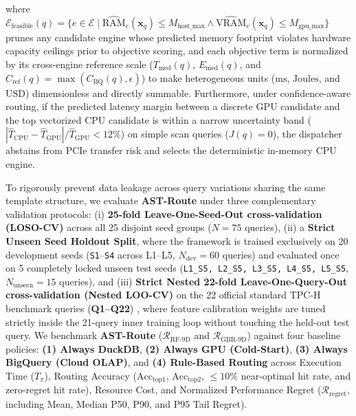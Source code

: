 \documentclass[10pt,a4paper]{article}
\begin{document}
where $\mathcal{E}_{\text{feasible}}(q) = \{e \in \mathcal{E} \mid \widehat{\text{RAM}}_e(\mathbf{x}_q) \le M_{\text{host\_max}} \land \widehat{\text{VRAM}}_e(\mathbf{x}_q) \le M_{\text{gpu\_max}}\}$ prunes any candidate engine whose predicted memory footprint violates hardware capacity ceilings prior to objective scoring, and each objective term is normalized by its cross-engine reference scale ($T_{\text{med}}(q)$, $E_{\text{med}}(q)$, and $C_{\text{ref}}(q) = \max(C_{\text{BQ}}(q), \epsilon)$) to make heterogeneous units ($\text{ms}$, $\text{Joules}$, and $\text{USD}$) dimensionless and directly summable. Furthermore, under confidence-aware routing, if the predicted latency margin between a discrete GPU candidate and the top vectorized CPU candidate is within a narrow uncertainty band ($|\hat{T}_{\text{CPU}} - \hat{T}_{\text{GPU}}|/\hat{T}_{\text{GPU}} < 12\%$) on simple scan queries ($J(q)=0$), the dispatcher abstains from PCIe transfer risk and selects the deterministic in-memory CPU engine.

To rigorously prevent data leakage across query variations sharing the same template structure, we evaluate \textbf{AST-Route} under three complementary validation protocols: (i) \textbf{25-fold Leave-One-Seed-Out cross-validation (LOSO-CV)} across all 25 disjoint seed groups ($N=75$ queries), (ii) a \textbf{Strict Unseen Seed Holdout Split}, where the framework is trained exclusively on 20 development seeds (\texttt{S1}--\texttt{S4} across L1--L5, $N_{\text{dev}}=60$ queries) and evaluated once on 5 completely locked unseen test seeds (\texttt{L1\_S5, L2\_S5, L3\_S5, L4\_S5, L5\_S5}, $N_{\text{unseen}}=15$ queries), and (iii) \textbf{Strict Nested 22-fold Leave-One-Query-Out cross-validation (Nested LOO-CV)} on the 22 official standard TPC-H benchmark queries (\textbf{Q1--Q22}) \cite{tpc2022tpch}, where feature calibration weights are tuned strictly inside the 21-query inner training loop without touching the held-out test query. We benchmark \textbf{AST-Route} ($\mathcal{R}_{\text{RF-9D}}$ and $\mathcal{R}_{\text{GBR-9D}}$) against four baseline policies: \textbf{(1) Always DuckDB}, \textbf{(2) Always GPU (Cold-Start)}, \textbf{(3) Always BigQuery (Cloud OLAP)}, and \textbf{(4) Rule-Based Routing} across Execution Time ($T_{\pi}$), Routing Accuracy ($\text{Acc}_{\text{top1}}$, $\text{Acc}_{\text{top2}}$, $\le 10\%$ near-optimal hit rate, and zero-regret hit rate), Resource Cost, and Normalized Performance Regret ($\mathcal{R}_{\text{regret}}$, including Mean, Median P50, P90, and P95 Tail Regret).
\end{document}
